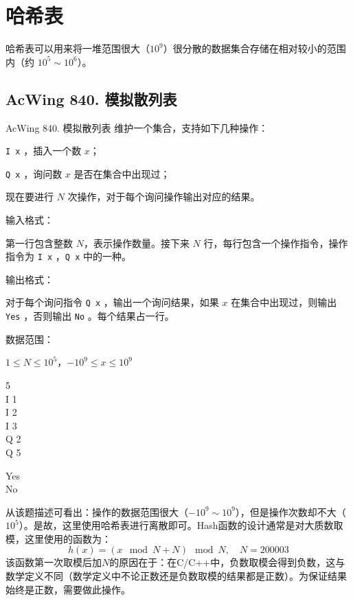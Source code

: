 \section{哈希表}
哈希表可以用来将一堆范围很大（$10^9$）很分散的数据集合存储在相对较小的范围内（约 $10^5 \sim 10^6$）。

\subsection{AcWing 840. 模拟散列表}

\begin{titledbox}{AcWing 840. 模拟散列表}
    维护一个集合，支持如下几种操作：

    \lstinline{I x} ，插入一个数 $x$；

    \lstinline{Q x} ，询问数 $x$ 是否在集合中出现过；

    现在要进行 $N$ 次操作，对于每个询问操作输出对应的结果。

    输入格式：

    第一行包含整数 $N$，表示操作数量。接下来 $N$ 行，每行包含一个操作指令，操作指令为 \lstinline{I x} ，\lstinline{Q x}  中的一种。

    输出格式：

    对于每个询问指令 \lstinline{Q x} ，输出一个询问结果，如果 $x$ 在集合中出现过，则输出 \lstinline{Yes} ，否则输出 \lstinline{No} 。每个结果占一行。

    数据范围：

    $1 \le N \le 10^5$，$-10^9 \le x \le 10^9$

    \begin{inputblock}
        5 \\
        I 1 \\
        I 2 \\
        I 3 \\
        Q 2 \\
        Q 5
    \end{inputblock}
    \begin{outputblock}
        Yes \\
        No
    \end{outputblock}
\end{titledbox}

从该题描述可看出：操作的数据范围很大（$-10^9 \sim 10^9$），但是操作次数却不大（$10^5$）。是故，这里使用哈希表进行离散即可。Hash函数的设计通常是对大质数取模，这里使用的函数为：
\begin{equation*}
    h(x) = (x \mod N + N) \mod N, \quad N = 200003
\end{equation*}
该函数第一次取模后加$N$的原因在于：在C/C++中，负数取模会得到负数，这与数学定义不同（数学定义中不论正数还是负数取模的结果都是正数）。为保证结果始终是正数，需要做此操作。

